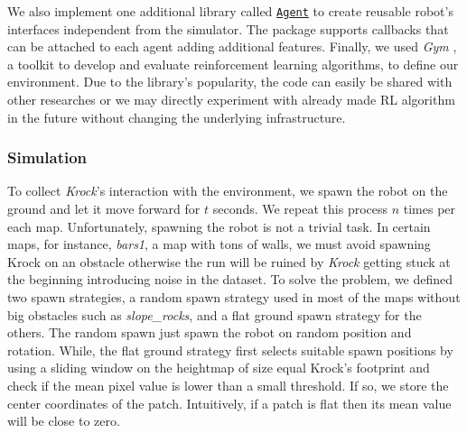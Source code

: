 \documentclass[../document.tex]{subfiles}
\begin{document}
We also implement one additional library called \href{https://github.com/FrancescoSaverioZuppichini/Master-Thesis/tree/master/core/simulation/agent}{\texttt{Agent}} to create reusable robot's interfaces independent from the simulator. The package supports callbacks that can be attached to each agent adding additional features. Finally, we used \emph{Gym} \cite{gym}, a toolkit to develop and evaluate reinforcement learning algorithms, to define our environment. Due to the library's popularity, the code can easily be shared with other researches or we may directly experiment with already made RL algorithm in the future without changing the underlying infrastructure.

\subsubsection{Simulation}
To collect \emph{Krock}'s interaction with the environment, we spawn the robot on the ground and let it move forward for $t$ seconds. We repeat this process $n$ times per each map.
    Unfortunately, spawning the robot is not a trivial task. In certain maps, for instance, \emph{bars1}, a map with tons of walls, we must avoid spawning Krock on an obstacle otherwise the run will be ruined by \emph{Krock} getting stuck at the beginning introducing noise in the dataset. To solve the problem, we defined two spawn strategies, a random spawn strategy used in most of the maps without big obstacles such as \emph{slope\_rocks}, and a flat ground spawn strategy for the others. The random spawn just spawn the robot on random position and rotation. While, the flat ground strategy first selects suitable spawn positions by using a sliding window on the heightmap of size equal Krock's footprint and check if the mean pixel value is lower than a small threshold. If so, we store the center coordinates of the patch. Intuitively, if a patch is flat then its mean value will be close to zero.
    
\end{document}
